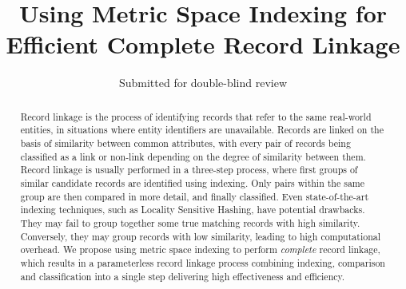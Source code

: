 \documentclass{llncs}
\begin{document}

       
\title{Using Metric Space Indexing for Efficient Complete Record Linkage}

\author{Submitted for double-blind review}

\maketitle


\begin{abstract}
Record linkage is the process of identifying records that refer to the
same real-world entities, in situations where entity identifiers are
unavailable. Records are linked on the basis of similarity between
common attributes, with every pair of records being classified as a
link or non-link depending on the degree of similarity between them.
Record linkage is usually performed in a three-step process, where first
groups of similar candidate records are identified using indexing. Only
pairs within the same group are then compared in more detail, and
finally classified.
%
Even state-of-the-art indexing techniques, such as Locality Sensitive
Hashing, have potential drawbacks. They may fail to group together some
true matching records with high similarity. Conversely, they may group
records with low similarity, leading to high computational overhead.
%
We propose using metric space indexing to perform \emph{complete} record
linkage, which results in a parameterless record linkage process
combining indexing, comparison and classification into a single step
delivering high effectiveness and efficiency.

\end{abstract}
\end{document}

